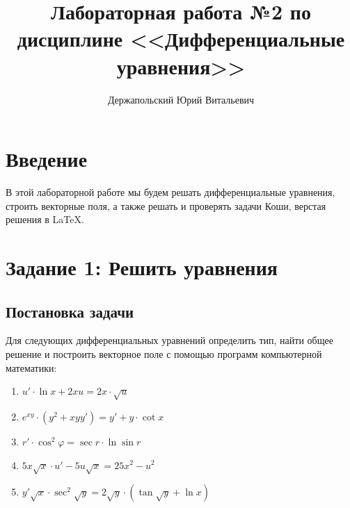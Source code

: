 \documentclass[14pt, a4paper, titlepage, fleqn]{extarticle}
\title{Лабораторная работа №2 по дисциплине <<Дифференциальные уравнения>>}
\author{Держапольский Юрий Витальевич}
\date{}
\begin{document}
    \maketitle

    \tableofcontents

    \pagebreak

    \section{Введение}
        В этой лабораторной работе мы будем решать дифференциальные
        уравнения, строить векторные поля, а также решать и проверять задачи Коши,
        верстая решения в \LaTeX.

    \pagebreak

    \section{Задание 1: Решить уравнения}
        \subsection{Постановка задачи}
            Для следующих дифференциальных уравнений определить тип, найти общее
            решение и построить векторное поле с помощью программ компьютерной математики:
            \begin{enumerate}
                \item \( u' \cdot \ln{x} + 2xu = 2x \cdot \sqrt{u} \)
                
                \item \( e^{xy} \cdot \left( y^2 + xyy' \right) = y' + y \cdot \cot{x} \)
                
                \item \( r' \cdot \cos^2{\varphi} = \sec{r} \cdot \ln{\sin{r}} \)
                
                \item \( 5x\sqrt{x} \cdot u' -5u\sqrt{x} = 25x^2 - u^2 \)
                
                \item \(
                        y' \sqrt{x} \cdot \sec^2{\sqrt{y}} = 2\sqrt{y} \cdot 
                        \left( \tan{\sqrt{y}+\ln{x}} \right) 
                    \)
            \end{enumerate}

        
\end{document}
